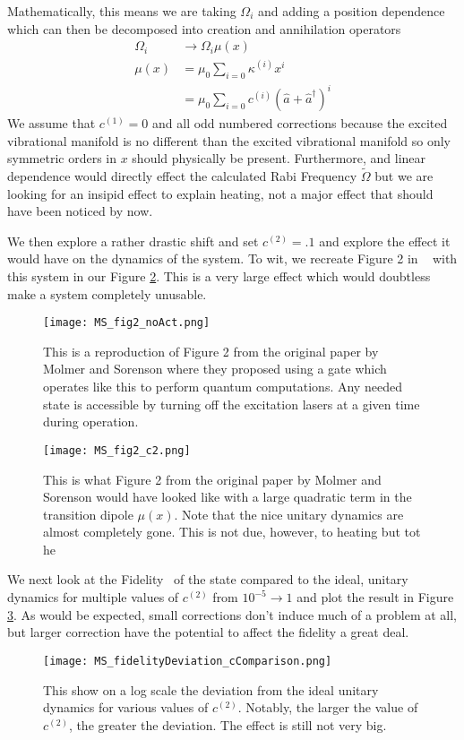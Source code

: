 Mathematically, this means we are taking $\Omega_i$ and adding a position dependence which can then be decomposed into creation and annihilation operators
\begin{align}
	\Omega_i &\rightarrow \Omega_i \mu(x) \\
	\mu(x) &= \mu_0 \sum_{i=0} \kappa^{(i)} x^i \\
	&= \mu_0 \sum_{i=0} c^{(i)} \left( \hat{a} + \hat{a}^{\dagger}\right)^i
\end{align}
We assume that $c^{(1)}=0$ and all odd numbered corrections because the excited vibrational manifold is no different than the excited vibrational manifold so only symmetric orders in $x$ should physically be present.  Furthermore, and linear dependence would directly effect the calculated Rabi Frequency $\tilde{\Omega}$ but we are looking for an insipid effect to explain heating, not a major effect that should have been noticed by now.

We then explore a rather drastic shift and set $c^{(2)} = .1$ and explore the effect it would have on the dynamics of the system.  To wit, we recreate Figure 2 in ~\cite{MolmerSorenson} with this system in our Figure \ref{fig:c2_big_dynamics}.  This is a very large effect which would doubtless make a system completely unusable.


\begin{figure}
   \texttt{[image: MS\_fig2\_noAct.png]}
   \caption{This is a reproduction of Figure 2 from the original paper by Molmer and Sorenson where they proposed using a gate which operates like this to perform quantum computations.  Any needed state is accessible by turning off the excitation lasers at a given time during operation.}
	\label{fig:MS_big_dynamics}
\end{figure}


\begin{figure}
   \texttt{[image: MS\_fig2\_c2.png]}
   \caption{This is what Figure 2 from the original paper by Molmer and Sorenson would have looked like with a large quadratic term in the transition dipole $\mu(x)$.  Note that the nice unitary dynamics are almost completely gone.  This is not due, however, to heating but tot he}
	\label{fig:c2_big_dynamics}
\end{figure}



We next look at the Fidelity~\cite{Bowdrey2002} of the state compared to the ideal, unitary dynamics for multiple values of $c^{(2)}$ from $10^{-5}\rightarrow 1$ and plot the result in Figure \ref{fig:c2_fidelity deviation}.  As would be expected, small corrections don't induce much of a problem at all, but larger correction have the potential to affect the fidelity a great deal.
\begin{figure}
   \texttt{[image: MS\_fidelityDeviation\_cComparison.png]}
   \caption{ This show on a log scale the deviation from the ideal unitary dynamics for various values of  $c^{(2)}$.  Notably, the larger the value of  $c^{(2)}$, the greater the deviation.  The effect is still not very big.}
	\label{fig:c2_fidelity deviation}
\end{figure}

